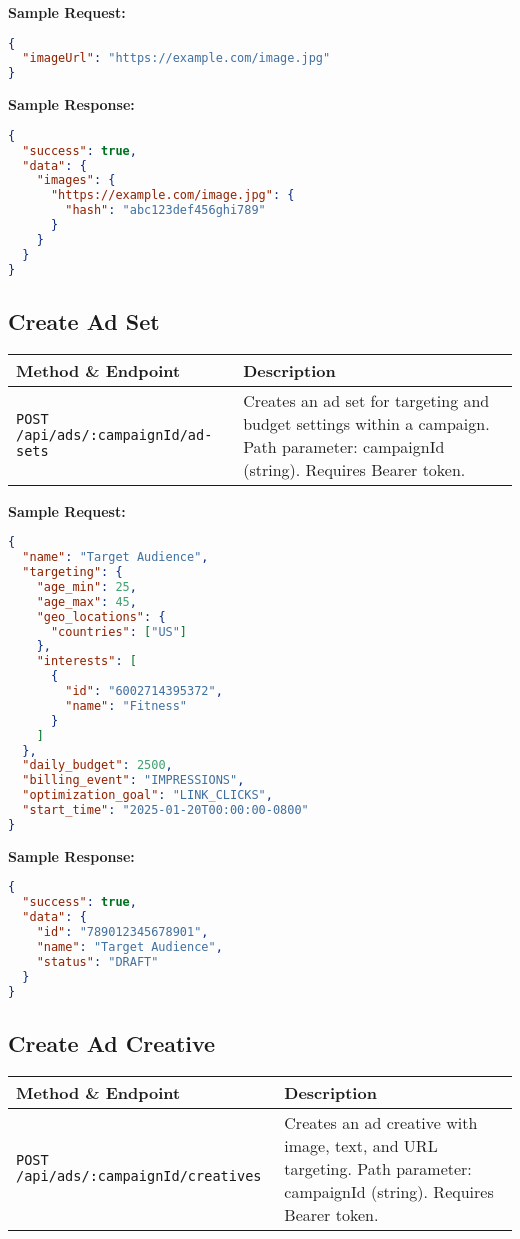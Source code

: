 \documentclass[11pt,a4paper]{article}
\begin{document}
\textbf{Sample Request:}
\begin{lstlisting}[language=json]
{
  "imageUrl": "https://example.com/image.jpg"
}
\end{lstlisting}

\textbf{Sample Response:}
\begin{lstlisting}[language=json]
{
  "success": true,
  "data": {
    "images": {
      "https://example.com/image.jpg": {
        "hash": "abc123def456ghi789"
      }
    }
  }
}
\end{lstlisting}

\subsection{Create Ad Set}
\begin{longtable}{L{3cm}Y}
\toprule
\textbf{Method \& Endpoint} & \textbf{Description} \\
\midrule
\texttt{POST /api/ads/:campaignId/ad-sets} & Creates an ad set for targeting and budget settings within a campaign. Path parameter: campaignId (string). Requires Bearer token. \\
\bottomrule
\end{longtable}

\textbf{Sample Request:}
\begin{lstlisting}[language=json]
{
  "name": "Target Audience",
  "targeting": {
    "age_min": 25,
    "age_max": 45,
    "geo_locations": {
      "countries": ["US"]
    },
    "interests": [
      {
        "id": "6002714395372",
        "name": "Fitness"
      }
    ]
  },
  "daily_budget": 2500,
  "billing_event": "IMPRESSIONS",
  "optimization_goal": "LINK_CLICKS",
  "start_time": "2025-01-20T00:00:00-0800"
}
\end{lstlisting}

\textbf{Sample Response:}
\begin{lstlisting}[language=json]
{
  "success": true,
  "data": {
    "id": "789012345678901",
    "name": "Target Audience",
    "status": "DRAFT"
  }
}
\end{lstlisting}

\subsection{Create Ad Creative}
\begin{longtable}{L{3cm}Y}
\toprule
\textbf{Method \& Endpoint} & \textbf{Description} \\
\midrule
\texttt{POST /api/ads/:campaignId/creatives} & Creates an ad creative with image, text, and URL targeting. Path parameter: campaignId (string). Requires Bearer token. \\
\bottomrule
\end{longtable}
\end{document}

